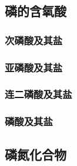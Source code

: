 \documentclass{ctexart}
\begin{document}
\subsection{磷的含氧酸}
\subsubsection{次磷酸及其盐}
\subsubsection{亚磷酸及其盐}
\subsubsection{连二磷酸及其盐}
\subsubsection{磷酸及其盐}
\subsection{磷氮化合物}
\end{document}
